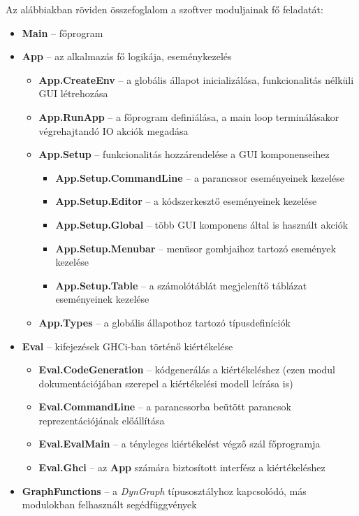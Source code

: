 Az alábbiakban röviden összefoglalom a szoftver moduljainak fő feladatát:

\begin{itemize}
	\item \textbf{Main} -- főprogram
	\item \textbf{App} -- az alkalmazás fő logikája, eseménykezelés
	\begin{itemize}
		\item \textbf{App.CreateEnv} -- a globális állapot inicializálása, funkcionalitás nélküli GUI létrehozása
		\item \textbf{App.RunApp} -- a főprogram definiálása, a main loop terminálásakor végrehajtandó IO akciók megadása
		\item \textbf{App.Setup}	-- funkcionalitás hozzárendelése a GUI komponenseihez
		\begin{itemize}
			\item \textbf{App.Setup.CommandLine} -- a parancssor eseményeinek kezelése
			\item \textbf{App.Setup.Editor} -- a kódszerkesztő eseményeinek kezelése
			\item \textbf{App.Setup.Global} -- több GUI komponens által is használt akciók
			\item \textbf{App.Setup.Menubar} -- menüsor gombjaihoz tartozó események kezelése
			\item \textbf{App.Setup.Table} -- a számolótáblát megjelenítő táblázat eseményeinek kezelése
		\end{itemize}
		\item \textbf{App.Types} -- a globális állapothoz tartozó típusdefiníciók
	\end{itemize}
	\item \textbf{Eval} -- kifejezések GHCi-ban történő kiértékelése
	\begin{itemize}
		\item \textbf{Eval.CodeGeneration} -- kódgenerálás a kiértékeléshez (ezen modul dokumentációjában szerepel a kiértékelési modell leírása is)
		\item \textbf{Eval.CommandLine} -- a parancssorba beütött parancsok reprezentációjának előállítása
		\item \textbf{Eval.EvalMain} -- a tényleges kiértékelést végző szál főprogramja
		\item \textbf{Eval.Ghci} -- az \textbf{App} számára biztosított interfész a kiértékeléshez
	\end{itemize}
	\item \textbf{GraphFunctions} -- a \textit{DynGraph} típusosztályhoz kapcsolódó, más modulokban felhasznált segédfüggvények 	

\end{itemize}
